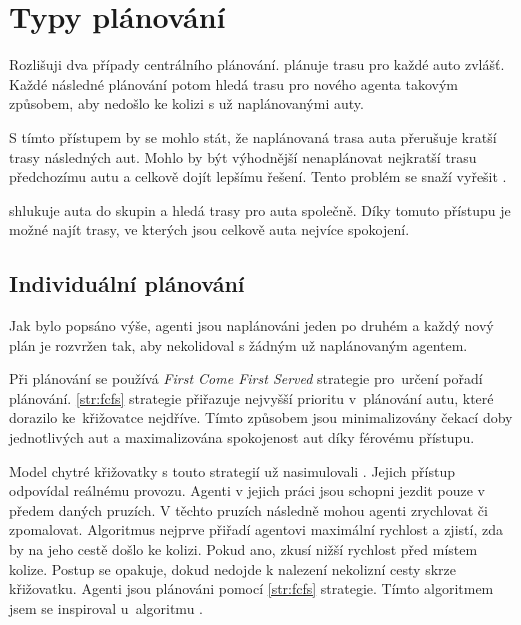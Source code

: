 \section{Typy plánování}\label{sec:typy_planovani}


Rozlišuji dva případy centrálního plánování.
 plánuje trasu pro každé auto zvlášť.
Každé následné plánování potom hledá trasu pro nového agenta takovým způsobem, aby nedošlo ke kolizi s už naplánovanými auty.

S tímto přístupem by se mohlo stát, že naplánovaná trasa auta přerušuje kratší trasy následných aut.
Mohlo by být výhodnější nenaplánovat nejkratší trasu předchozímu autu a celkově dojít lepšímu řešení.
Tento problém se snaží vyřešit .

 shlukuje auta do skupin a hledá trasy pro auta společně.
Díky tomuto přístupu je možné najít trasy, ve kterých jsou celkově auta nejvíce spokojení.

\subsection{Individuální plánování}\label{subsec:individualni_planovani}

%
%




Jak bylo popsáno výše, agenti jsou naplánováni jeden po druhém a
každý nový plán je rozvržen tak, aby nekolidoval s žádným už naplánovaným agentem.

Při plánování se používá \emph{First Come First Served}  strategie pro~určení pořadí plánování.
\ref{str:fcfs} strategie přiřazuje nejvyšší prioritu v~plánování autu, které dorazilo ke~křižovatce nejdříve.
Tímto způsobem jsou minimalizovány čekací doby jednotlivých aut a maximalizována spokojenost aut díky férovému přístupu.

Model chytré křižovatky s touto strategií už nasimulovali \citet*{Dresner}.
Jejich přístup odpovídal reálnému provozu.
Agenti v jejich práci jsou schopni jezdit pouze v předem daných pruzích.
V těchto pruzích následně mohou agenti zrychlovat či zpomalovat.
Algoritmus nejprve přiřadí agentovi maximální rychlost a zjistí, zda by na jeho cestě došlo ke kolizi.
Pokud ano, zkusí nižší rychlost před místem kolize.
Postup se opakuje, dokud nedojde k nalezení nekolizní cesty skrze křižovatku.
Agenti jsou plánováni pomocí \ref{str:fcfs} strategie.
Tímto algoritmem jsem se inspiroval u~algoritmu .

